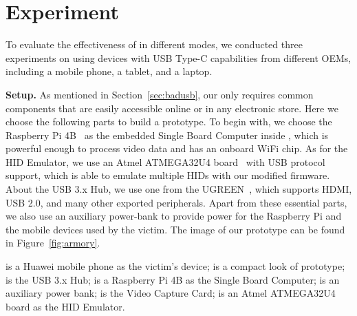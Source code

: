\section{Experiment}
\label{sec:experiment}


To evaluate the effectiveness of \tool in different modes, we conducted three
experiments on \tool using devices with \ac{USB} Type-C capabilities from different
\acp{OEM}, including a mobile phone, a tablet, and a laptop.

\textbf{Setup.}
As mentioned in Section~\ref{sec:badusb},
our \tool only requires common components that are easily accessible online or
in any electronic store. Here we choose the following parts to build a
prototype. To begin with, we choose the Raspberry Pi 4B~\cite{pi4b} as the embedded Single Board
Computer inside \tool, which is powerful enough to process video data and has
an onboard WiFi chip. As for the \ac{HID} Emulator, we use an Atmel ATMEGA32U4 board~\cite{atmel}
with \ac{USB} protocol support, which is able to emulate multiple \acp{HID}
with our modified firmware. About the \ac{USB} 3.x Hub, we use one from the
UGREEN~\cite{ugreen}, which supports HDMI, \ac{USB} 2.0, and many other exported peripherals.
Apart from these essential parts, we also use an auxiliary power-bank to
provide power for the Raspberry Pi and the mobile devices used by the victim.
The image of our \tool prototype can be found in Figure~\ref{fig:armory}.

 is a Huawei mobile phone as the victim's device;  is a compact look of \tool prototype;  is the \ac{USB} 3.x Hub;  is a Raspberry Pi 4B as the Single Board Computer;  is an auxiliary power bank;  is the Video Capture Card;  is an Atmel ATMEGA32U4 board as the \ac{HID} Emulator.


